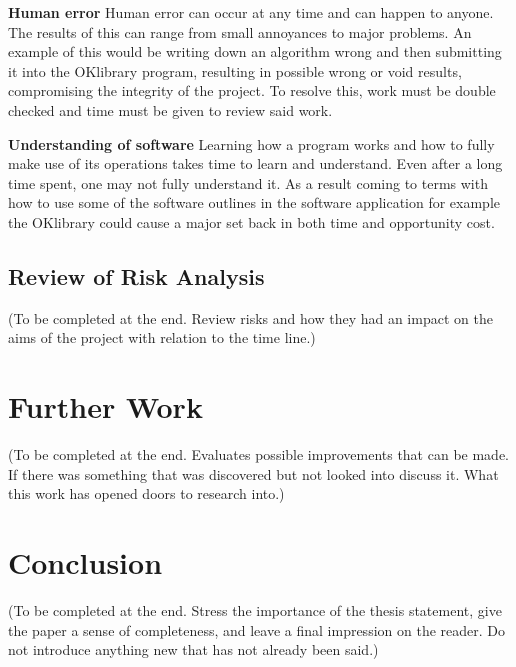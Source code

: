 \documentclass[11pt,a4paper]{report}
\begin{document}
\textbf{Human error}
Human error can occur at any time and can happen to anyone. The results of this can range from small annoyances to major problems. An example of this would be writing down an algorithm wrong and then submitting it into the OKlibrary program, resulting in possible wrong or void results, compromising the integrity of the project. To resolve this, work must be double checked and time must be given to review said work.

\textbf{Understanding of software}
Learning how a program works and how to fully make use of its operations takes time to learn and understand. Even after a long time spent, one may not fully understand it. As a result coming to terms with how to use some of the software outlines in the software application for example the OKlibrary could cause a major set back in both time and opportunity cost.

\subsection{Review of Risk Analysis}
(To be completed at the end. Review risks and how they had an impact on the aims of the project with relation to the time line.)

\section{Further Work}
(To be completed at the end. Evaluates possible improvements that can be made. If there was something that was discovered but not looked into discuss it. What this work has opened doors to research into.)

\section{Conclusion}
(To be completed at the end. Stress the importance of the thesis statement, give the paper a sense of completeness, and
leave a final impression on the reader. Do not introduce anything new that has not already been said.)



\nocite{*}

\end{document}

